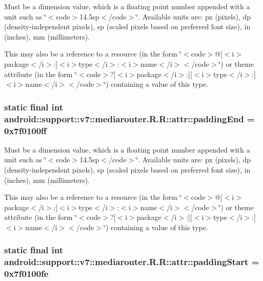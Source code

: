 Must be a dimension value, which is a floating point number appended with a unit such as \char`\"{}$<$code$>$14.5sp$<$/code$>$\char`\"{}. Available units are: px (pixels), dp (density-independent pixels), sp (scaled pixels based on preferred font size), in (inches), mm (millimeters). 

This may also be a reference to a resource (in the form \char`\"{}$<$code$>$@\mbox{[}$<$i$>$package$<$/i$>$:\mbox{]}$<$i$>$type$<$/i$>$:$<$i$>$name$<$/i$>$$<$/code$>$\char`\"{}) or theme attribute (in the form \char`\"{}$<$code$>$?\mbox{[}$<$i$>$package$<$/i$>$:\mbox{]}\mbox{[}$<$i$>$type$<$/i$>$:\mbox{]}$<$i$>$name$<$/i$>$$<$/code$>$\char`\"{}) containing a value of this type. \hypertarget{classandroid_1_1support_1_1v7_1_1mediarouter_1_1_r_1_1attr_9403a630ddf6aca0b6edfcea08483b9d}{
\subsubsection[{paddingEnd}]{\setlength{\rightskip}{0pt plus 5cm}static final int android::support::v7::mediarouter.R.R::attr::paddingEnd = 0x7f0100ff}}
\label{classandroid_1_1support_1_1v7_1_1mediarouter_1_1_r_1_1attr_9403a630ddf6aca0b6edfcea08483b9d}


Must be a dimension value, which is a floating point number appended with a unit such as \char`\"{}$<$code$>$14.5sp$<$/code$>$\char`\"{}. Available units are: px (pixels), dp (density-independent pixels), sp (scaled pixels based on preferred font size), in (inches), mm (millimeters). 

This may also be a reference to a resource (in the form \char`\"{}$<$code$>$@\mbox{[}$<$i$>$package$<$/i$>$:\mbox{]}$<$i$>$type$<$/i$>$:$<$i$>$name$<$/i$>$$<$/code$>$\char`\"{}) or theme attribute (in the form \char`\"{}$<$code$>$?\mbox{[}$<$i$>$package$<$/i$>$:\mbox{]}\mbox{[}$<$i$>$type$<$/i$>$:\mbox{]}$<$i$>$name$<$/i$>$$<$/code$>$\char`\"{}) containing a value of this type. \hypertarget{classandroid_1_1support_1_1v7_1_1mediarouter_1_1_r_1_1attr_f94a9555456f9be0c66eea0f18e39d73}{
\subsubsection[{paddingStart}]{\setlength{\rightskip}{0pt plus 5cm}static final int android::support::v7::mediarouter.R.R::attr::paddingStart = 0x7f0100fe}}
\label{classandroid_1_1support_1_1v7_1_1mediarouter_1_1_r_1_1attr_f94a9555456f9be0c66eea0f18e39d73}


